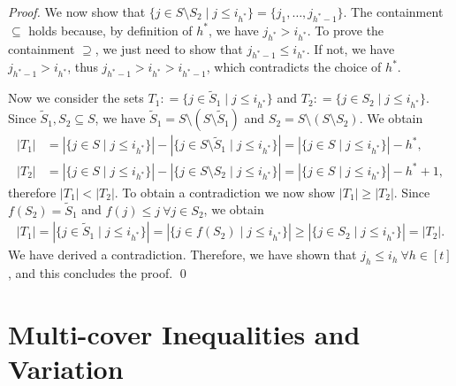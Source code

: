 \begin{proof}
We now show that $\{j \in S \setminus S_2 \mid j \leq i_{h^*}\} = \{j_1, \ldots, j_{h^* - 1}\}$.
The containment $\subseteq$ holds because, by definition of $h^*$, we have $j_{h^*} > i_{h^*}$.
To prove the containment $\supseteq$, we just need to show that $j_{h^* - 1} \le i_{h^*}$.
If not, we have $j_{h^* - 1} > i_{h^*}$, thus $j_{h^* - 1} > i_{h^*} > i_{h^* - 1}$, which contradicts the choice of $h^*$.




Now we consider the sets $T_1: = \{j \in \tilde S_1 \mid j \leq i_{h^*}\}$ and $T_2: = \{j \in S_2 \mid j \leq i_{h^*}\}$. 
Since $\tilde S_1,S_2 \subseteq S$, we have $\tilde S_1 = S \setminus (S \setminus \tilde S_1)$ and $S_2 = S \setminus (S \setminus S_2)$.
We obtain 
\begin{align*}
|T_1| & = |\{j \in S \mid j \leq i_{h^*}\}| - |\{j \in S \setminus \tilde S_1 \mid j \leq i_{h^*}\}|  
= |\{j \in S \mid j \leq i_{h^*}\}| - h^*, \\
|T_2| & = |\{j \in S \mid j \leq i_{h^*}\}| - |\{j \in S \setminus S_2 \mid j \leq i_{h^*}\}| 
= |\{j \in S \mid j \leq i_{h^*}\}| - h^* + 1,
\end{align*}
therefore $|T_1| < |T_2|$.
To obtain a contradiction we now show $|T_1| \ge |T_2|$.
Since $f(S_2) = \tilde S_1$ and $f(j) \leq j \ \forall j \in S_2$, we obtain 
\begin{align*}
|T_1| = |\{j \in \tilde S_1 \mid j \leq i_{h^*} \}| = |\{j \in f(S_2) \mid j \leq i_{h^*}\}| \geq |\{j \in S_2 \mid j \leq i_{h^*}\}| = |T_2|.
\end{align*}
We have derived a contradiction.
Therefore, we have shown that $j_h \leq i_h \ \forall h \in [t]$, and this concludes the proof.
\qed \end{proof}





\section{Multi-cover Inequalities and Variation}
\label{sec:MCI}

